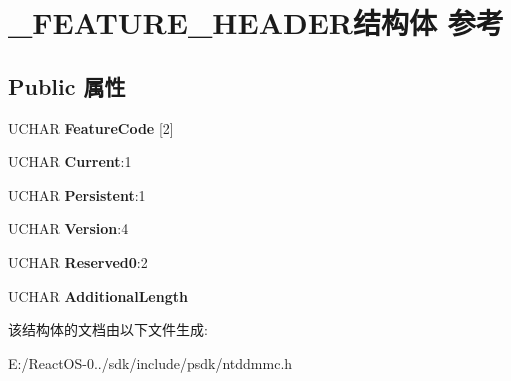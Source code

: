 \hypertarget{struct___f_e_a_t_u_r_e___h_e_a_d_e_r}{}\section{\+\_\+\+F\+E\+A\+T\+U\+R\+E\+\_\+\+H\+E\+A\+D\+E\+R结构体 参考}
\label{struct___f_e_a_t_u_r_e___h_e_a_d_e_r}
\subsection*{Public 属性}
\begin{DoxyCompactItemize}
\item 
\mbox{\label{struct___f_e_a_t_u_r_e___h_e_a_d_e_r_aeaa974d584685e5f8699a6c3ac23f434}} 
U\+C\+H\+AR {\bfseries Feature\+Code} \mbox{[}2\mbox{]}
\item 
\mbox{\label{struct___f_e_a_t_u_r_e___h_e_a_d_e_r_af60ececc3492a8a423dbfda432a0beff}} 
U\+C\+H\+AR {\bfseries Current}\+:1
\item 
\mbox{\label{struct___f_e_a_t_u_r_e___h_e_a_d_e_r_a34f405cfbcbe9542e43a57be7fe35ed1}} 
U\+C\+H\+AR {\bfseries Persistent}\+:1
\item 
\mbox{\label{struct___f_e_a_t_u_r_e___h_e_a_d_e_r_a8e6638101bbc8d1e1a459aa273c1d6f4}} 
U\+C\+H\+AR {\bfseries Version}\+:4
\item 
\mbox{\label{struct___f_e_a_t_u_r_e___h_e_a_d_e_r_abd675eb79163c409f94ef5e4f47f769b}} 
U\+C\+H\+AR {\bfseries Reserved0}\+:2
\item 
\mbox{\label{struct___f_e_a_t_u_r_e___h_e_a_d_e_r_a09c8d52582f111f1f257fb5b1f1db6e7}} 
U\+C\+H\+AR {\bfseries Additional\+Length}
\end{DoxyCompactItemize}


该结构体的文档由以下文件生成\+:\begin{DoxyCompactItemize}
\item 
E\+:/\+React\+O\+S-\/0../sdk/include/psdk/ntddmmc.\+h\end{DoxyCompactItemize}
